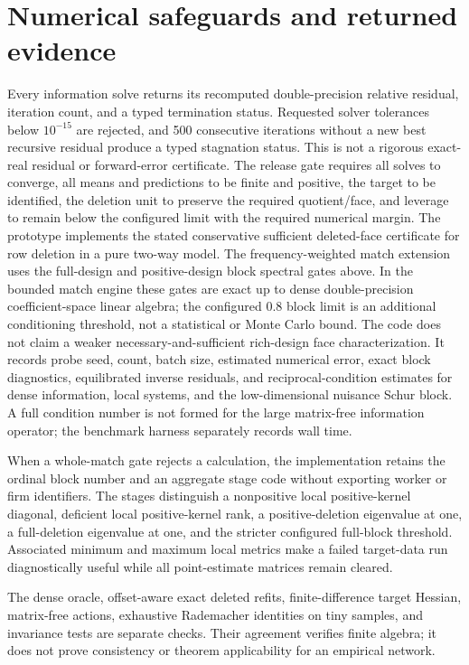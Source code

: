 \documentclass[11pt]{article}
\begin{document}
\section{Numerical safeguards and returned evidence}

Every information solve returns its recomputed double-precision relative
residual, iteration count, and a typed termination status. Requested solver
tolerances below $10^{-15}$ are rejected, and 500 consecutive iterations
without a new best recursive residual produce a typed stagnation status. This is not a
rigorous exact-real residual or forward-error certificate. The release gate
requires all solves to converge,
all means and predictions to be finite and positive, the target to be
identified, the deletion unit to preserve the required quotient/face, and
leverage to remain below the configured limit with the required numerical
margin.  The prototype implements the stated conservative sufficient
deleted-face certificate for row deletion in a pure two-way model. The
frequency-weighted match extension uses the full-design and positive-design
block spectral gates above. In the bounded match engine these gates are exact
up to dense double-precision coefficient-space linear algebra; the configured
0.8 block limit is an additional conditioning threshold, not a statistical or
Monte Carlo bound. The code does not claim a weaker necessary-and-sufficient
rich-design face characterization. It records probe seed, count, batch size,
estimated numerical error, exact block diagnostics, equilibrated inverse
residuals, and reciprocal-condition estimates for dense information, local
systems, and the low-dimensional nuisance Schur block. A full condition number
is not formed for the large matrix-free information operator;
the benchmark harness separately records wall time.

When a whole-match gate rejects a calculation, the implementation retains the
ordinal block number and an aggregate stage code without exporting worker or
firm identifiers. The stages distinguish a nonpositive local
positive-kernel diagonal, deficient local positive-kernel rank, a
positive-deletion eigenvalue at one, a full-deletion eigenvalue at one, and
the stricter configured full-block threshold. Associated minimum and maximum
local metrics make a failed target-data run diagnostically useful while all
point-estimate matrices remain cleared.

The dense oracle, offset-aware exact deleted refits, finite-difference target Hessian,
matrix-free actions, exhaustive Rademacher identities on tiny samples, and
invariance tests are separate checks.  Their agreement verifies finite
algebra; it does not prove consistency or theorem applicability for an
empirical network.
\end{document}
